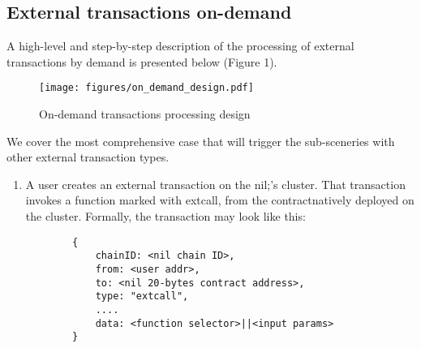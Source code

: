 \subsection{External transactions on-demand}

A high-level and step-by-step description of the processing of external transactions 
by demand is presented below (Figure 1).
\begin{figure}[H]
    \centering
	\texttt{[image: figures/on\_demand\_design.pdf]}
    \caption{On-demand transactions processing design}
     \label{figure:on-demand-design}
\end{figure}
We cover the most comprehensive case that will trigger the sub-sceneries with other external 
transaction types.

\begin{enumerate}
    \item A user creates an external transaction on the nil;'s cluster. That transaction 
    invokes a function marked with extcall, from the contractnatively deployed on the cluster. 
    Formally, the transaction may look like this:

    \begin{verbatim}
        {
            chainID: <nil chain ID>,
            from: <user addr>,
            to: <nil 20-bytes contract address>,
            type: "extcall",
            ....
            data: <function selector>||<input params>
        }
    \end{verbatim}


\end{enumerate}
